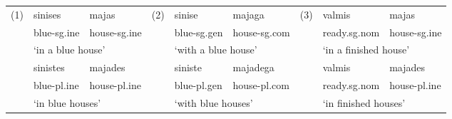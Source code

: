 \documentclass[11pt]{article}
\begin{document}
\begin{table}[h]
\small
\begin{tabular}{cllcllcll}
(1) & sinises & majas & (2) & sinise & majaga & (3) & valmis & majas \\
& blue-{\sc sg.ine} & house-{\sc sg.ine} &  & blue-{\sc sg.gen} & house-{\sc sg.com} &  & ready.{\sc sg.nom} & house-{\sc sg.ine} \\
& \multicolumn{2}{l}{`in a blue house'} &  & \multicolumn{2}{l}{`with a blue house'} &  & \multicolumn{2}{l}{`in a finished house'} \\
& sinistes & majades &  & siniste & majadega &  & valmis & majades \\
& blue-{\sc pl.ine} & house-{\sc pl.ine} &  & blue-{\sc pl.gen} & house-{\sc pl.com} &  & ready.{\sc sg.nom} & house-{\sc pl.ine} \\
& \multicolumn{2}{l}{`in blue houses'} &  & \multicolumn{2}{l}{`with blue
                                         houses'} &  &
                                                     \multicolumn{2}{l}{`in finished houses'}

\end{tabular}
\end{table}


\end{document}
